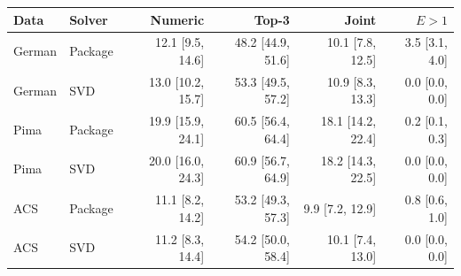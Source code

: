 \begin{tabular}{llrrrr}
\toprule
Data & Solver & Numeric & Top-3 & Joint & $E>1$ \\
\midrule
German & Package & 12.1 [9.5, 14.6] & 48.2 [44.9, 51.6] & 10.1 [7.8, 12.5] & 3.5 [3.1, 4.0] \\
German & SVD & 13.0 [10.2, 15.7] & 53.3 [49.5, 57.2] & 10.9 [8.3, 13.3] & 0.0 [0.0, 0.0] \\
Pima & Package & 19.9 [15.9, 24.1] & 60.5 [56.4, 64.4] & 18.1 [14.2, 22.4] & 0.2 [0.1, 0.3] \\
Pima & SVD & 20.0 [16.0, 24.3] & 60.9 [56.7, 64.9] & 18.2 [14.3, 22.5] & 0.0 [0.0, 0.0] \\
ACS & Package & 11.1 [8.2, 14.2] & 53.2 [49.3, 57.3] & 9.9 [7.2, 12.9] & 0.8 [0.6, 1.0] \\
ACS & SVD & 11.2 [8.3, 14.4] & 54.2 [50.0, 58.4] & 10.1 [7.4, 13.0] & 0.0 [0.0, 0.0] \\
\bottomrule
\end{tabular}